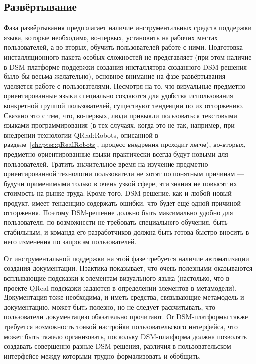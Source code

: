 \subsection{Развёртывание}
Фаза развёртывания предполагает наличие инструментальных средств поддержки языка, 
которые необходимо, во-первых, установить на рабочих местах пользователей, а во-вторых, 
обучить пользователей работе с ними. Подготовка инсталляционного пакета особых сложностей 
не представляет (при этом наличие в DSM-платформе поддержки создания инсталлятора созданного 
DSM-решения было бы весьма желательно), основное внимание на фазе развёртывания уделяется 
работе с пользователями. Несмотря на то, что визуальные предметно-ориентированные 
языки специально создаются для удобства использования конкретной группой пользователей, 
существуют тенденции по их отторжению. Связано это с тем, что, во-первых, люди привыкли 
пользоваться текстовыми языками программирования (в тех случаях, когда это не так, например, 
при внедрении технологии QReal:Robots, описанной в разделе~\ref{chapter:qRealRobots}, 
процесс внедрения проходит легче), во-вторых, предметно-ориентированные языки практически 
всегда будут новыми для пользователей. Тратить значительное время на изучение предметно-ориентированной 
технологии пользователи не хотят по понятным причинам --- будучи применимыми только 
в очень узкой сфере, эти знания не повысят их стоимость на рынке труда. Кроме того, 
DSM-решение, как и любой новый продукт, имеет тенденцию содержать ошибки, что будет 
ещё одной причиной отторжения. Поэтому DSM-решение должно быть максимально удобно для 
пользователя, по возможности не требовать специального обучения, быть стабильным, 
и команда его разработчиков должна быть готова быстро вносить в него изменения по 
запросам пользователей.

От инструментальной поддержки на этой фазе требуется наличие автоматизации создания 
документации. Практика показывает, что очень полезными оказываются всплывающие подсказки 
к элементам визуального языка (настолько, что в проекте QReal подсказки задаются в 
определении элементов в метамодели). Документация тоже необходима, и иметь средства, 
связывающие метамодель и документацию, может быть полезно, но не следует рассчитывать, 
что пользователи документацию обязательно прочитают. От DSM-платформы также требуется 
возможность тонкой настройки пользовательского интерфейса, что может быть тяжело организовать,
поскольку DSM-платформа должна позволять создавать совершенно разные DSM-решения, 
различия в пользовательском интерфейсе между которыми трудно формализовать и обобщить.

